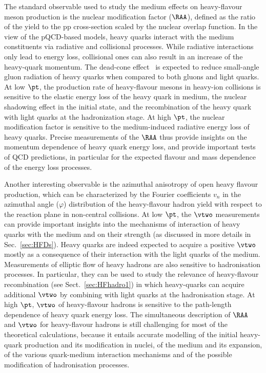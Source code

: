 The standard observable used to study the medium effects on heavy-flavour meson production is the nuclear modification factor ($\RAA$), defined as the ratio of the \PbPb yield to the pp cross-section scaled by the nuclear overlap function. In the view of the pQCD-based models, heavy quarks interact with the medium constituents via radiative and collisional processes. While radiative interactions only lead to energy loss, collisional ones can also result in an increase of the heavy-quark momentum. The dead-cone effect~\cite{DOKSHITZER2001199} is expected to reduce small-angle gluon radiation of heavy quarks when compared to both gluons and light quarks. At low $\pt$, the production rate of heavy-flavour mesons in heavy-ion collisions is sensitive to the elastic energy loss of the heavy quark in medium, the nuclear shadowing effect in the initial state, and the recombination of the heavy quark with light quarks at the hadronization stage. At high $\pt$, the nuclear modification factor is sensitive to the medium-induced radiative energy loss of heavy quarks. Precise measurements of the $\RAA$ thus provide insights on the momentum dependence of heavy quark energy loss, and provide important tests of QCD predictions, in particular for the expected flavour and mass dependence of the energy loss processes.

Another interesting observable is the azimuthal anisotropy of open heavy flavour production, which can be characterized by the Fourier coefficients $v_n$ in the azimuthal angle ($\varphi$) distribution of the heavy-flavour hadron yield with respect to the reaction plane in non-central \PbPb collisions. 
At low $\pt$, the $\vtwo$ measurements can provide important insights into the mechanisms of interaction of heavy quarks with the medium and on their strength (as discussed in more details in Sec.~\ref{sec:HFDs}). Heavy quarks are indeed expected to acquire a positive $\vtwo$ mostly as a consequence of their interaction with the light quarks of the medium.
Measurements of elliptic flow of heavy hadrons are also sensitive to hadronisation processes. In particular, they can be used to study the relevance of heavy-flavour recombination (see Sect.~\ref{sec:HFhadro1}) in which heavy-quarks can acquire additional $\vtwo$ by combining with light quarks at the hadronisation stage. 
At high $\pt$, $\vtwo$ of heavy-flavour hadrons is sensitive to the path-length dependence of heavy quark energy loss. The simultaneous description of $\RAA$ and $\vtwo$ for heavy-flavour hadrons is still challenging for most of the theoretical calculations, because it entails accurate modelling of the initial heavy-quark production and its modification in nuclei, of the medium and its expansion, of the various quark-medium interaction mechanisms and of the possible modification of hadronisation processes.

